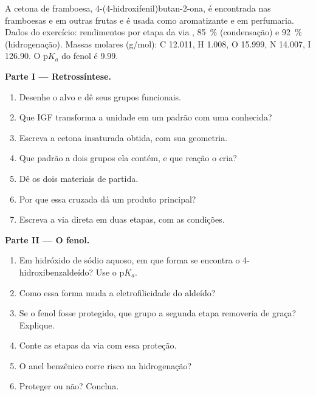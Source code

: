 \begin{problem}
\label{pb:b2:retrosynthesis:1}
A cetona de framboesa, 4-(4-hidroxifenil)butan-2-ona, é encontrada nas framboesas e em outras frutas e
é usada como aromatizante e em perfumaria. Dados do exercício: rendimentos por etapa da via ,
85~\% (condensação) e 92~\% (hidrogenação). Massas molares (\unit{g/mol}): C 12.011, H 1.008, O 15.999,
N 14.007, I 126.90. O $\mathrm pK_a$ do fenol é 9.99.

\medskip
\noindent\textbf{Parte I --- Retrossíntese.}
\begin{enumerate}
  \item Desenhe o alvo e dê seus grupos funcionais.
  \item Que IGF transforma a unidade  em um padrão com uma  conhecida?
  \item Escreva a cetona insaturada obtida, com sua geometria.
  \item Que padrão a dois grupos ela contém, e que reação o cria?
  \item Dê os dois materiais de partida.
  \item Por que essa  cruzada dá um produto principal?
  \item Escreva a via direta em duas etapas, com as condições.
\end{enumerate}

\medskip
\noindent\textbf{Parte II --- O fenol.}
\begin{enumerate}[resume]
  \item Em hidróxido de sódio aquoso, em que forma se encontra o 4-hidroxibenzaldeído? Use o
        $\mathrm pK_a$.
  \item Como essa forma muda a eletrofilicidade do aldeído?
  \item Se o fenol fosse protegido, que grupo a segunda etapa removeria de graça? Explique.
  \item Conte as etapas da via com essa proteção.
  \item O anel benzênico corre risco na hidrogenação?
  \item Proteger ou não? Conclua.
\end{enumerate}


\end{problem}
